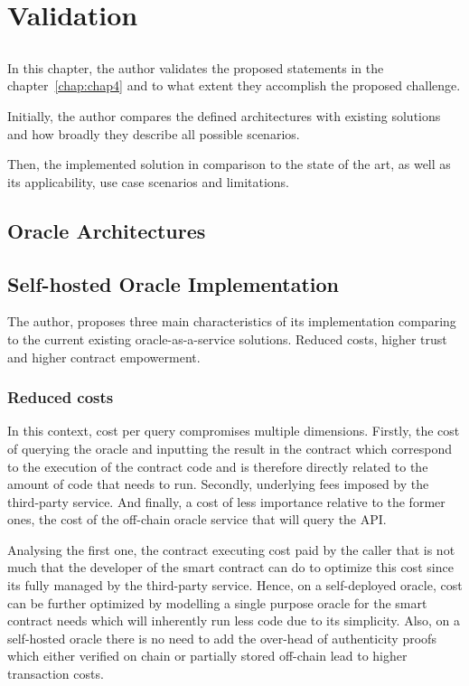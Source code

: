 \chapter{Validation} \label{chap:chap7}

\section*{}
In this chapter, the author validates the proposed statements in the chapter~\ref{chap:chap4} and to what extent they accomplish the proposed challenge.

Initially, the author compares the defined architectures with existing solutions and how broadly they describe all possible scenarios.

Then, the implemented solution in comparison to the state of the art, as well as its applicability, use case scenarios and limitations.


\section{Oracle Architectures}


\section{Self-hosted Oracle Implementation}

The author, proposes three main characteristics of its implementation comparing to the current existing oracle-as-a-service solutions. Reduced costs, higher trust and higher contract empowerment.

\subsection{Reduced costs}

In this context, cost per query compromises multiple dimensions. Firstly, the cost of querying the oracle and inputting the result in the contract which correspond to the execution of the contract code and is therefore directly related to the amount of code that needs to run. Secondly, underlying fees imposed by the third-party service. And finally, a cost of less importance relative to the former ones, the cost of the off-chain oracle service that will query the API.

Analysing the first one, the contract executing cost paid by the caller that is not much that the developer of the smart contract can do to optimize this cost since its fully managed by the third-party service. Hence, on a self-deployed oracle, cost can be further optimized by modelling a single purpose oracle for the smart contract needs which will inherently run less code due to its simplicity. Also, on a self-hosted oracle there is no need to add the over-head of authenticity proofs which either verified on chain or partially stored off-chain lead to higher transaction costs.


